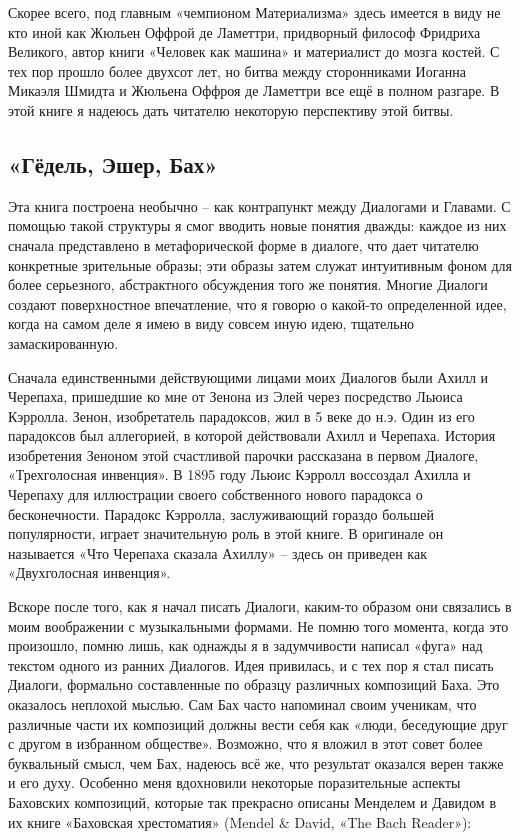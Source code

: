 \documentclass[../main.tex]{subfiles}
\begin{document}
Скорее всего, под главным «чемпионом Материализма» здесь имеется в виду не кто иной как Жюльен Оффрой де Ламеттри, придворный философ Фридриха Великого, автор книги «Человек как машина» и материалист до мозга костей. С тех пор прошло более двухсот лет, но битва между сторонниками Иоганна Микаэля Шмидта и Жюльена Оффроя де Ламеттри все ещё в полном разгаре. В этой книге я надеюсь дать читателю некоторую перспективу этой битвы.


\subsection{«Гёдель, Эшер, Бах»}

Эта книга построена необычно \--- как контрапункт между Диалогами и Главами. С помощью такой структуры я смог вводить новые понятия дважды: каждое из них сначала представлено в метафорической форме в диалоге, что дает читателю конкретные зрительные образы; эти образы затем служат интуитивным фоном для более серьезного, абстрактного обсуждения того же понятия. Многие Диалоги создают поверхностное впечатление, что я говорю о какой-то определенной идее, когда на самом деле я имею в виду совсем иную идею, тщательно замаскированную.

Сначала единственными действующими лицами моих Диалогов были Ахилл и Черепаха, пришедшие ко мне от Зенона из Элей через посредство Льюиса Кэрролла. Зенон, изобретатель парадоксов, жил в 5 веке до н.э. Один из его парадоксов был аллегорией, в которой действовали Ахилл и Черепаха. История изобретения Зеноном этой счастливой парочки рассказана в первом Диалоге, «Трехголосная инвенция». В 1895 году Льюис Кэрролл воссоздал Ахилла и Черепаху для иллюстрации своего собственного нового парадокса о бесконечности. Парадокс Кэрролла, заслуживающий гораздо большей популярности, играет значительную роль в этой книге. В оригинале он называется «Что Черепаха сказала Ахиллу» \--- здесь он приведен как «Двухголосная инвенция».

Вскоре после того, как я начал писать Диалоги, каким-то образом они связались в моим воображении с музыкальными формами. Не помню того момента, когда это произошло, помню лишь, как однажды я в задумчивости написал «фуга» над текстом одного из ранних Диалогов. Идея привилась, и с тех пор я стал писать Диалоги, формально составленные по образцу различных композиций Баха. Это оказалось неплохой мыслью. Сам Бах часто напоминал своим ученикам, что различные части их композиций должны вести себя как «люди, беседующие друг с другом в избранном обществе». Возможно, что я вложил в этот совет более буквальный смысл, чем Бах, надеюсь всё же, что результат оказался верен также и его духу. Особенно меня вдохновили некоторые поразительные аспекты Баховских композиций, которые так прекрасно описаны Менделем и Давидом в их книге «Баховская хрестоматия» (Mendel \& David, «The Bach Reader»):
\end{document}
